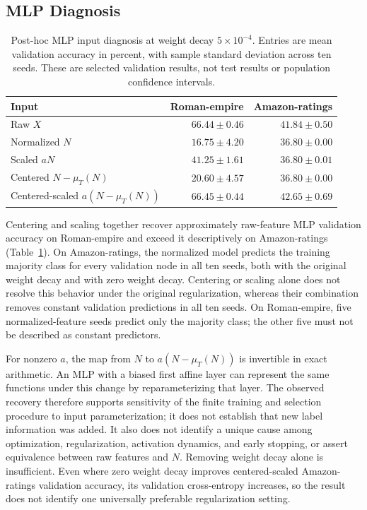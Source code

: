 \subsection{MLP Diagnosis}

\begin{table}[ht]
\centering
\caption{Post-hoc MLP input diagnosis at weight decay $5\times10^{-4}$. Entries are mean validation accuracy in percent, with sample standard deviation across ten seeds. These are selected validation results, not test results or population confidence intervals.}
\label{tab:mlp_parameterization}
\small
\begin{tabular}{@{}lrr@{}}
\toprule
Input & Roman-empire & Amazon-ratings \\
\midrule
Raw $X$ & $66.44\pm0.46$ & $41.84\pm0.50$ \\
Normalized $N$ & $16.75\pm4.20$ & $36.80\pm0.00$ \\
Scaled $aN$ & $41.25\pm1.61$ & $36.80\pm0.01$ \\
Centered $N-\mu_T(N)$ & $20.60\pm4.57$ & $36.80\pm0.00$ \\
Centered-scaled $a(N-\mu_T(N))$ & $66.45\pm0.44$ & $42.65\pm0.69$ \\
\bottomrule
\end{tabular}
\end{table}

Centering and scaling together recover approximately raw-feature MLP validation accuracy on Roman-empire and exceed it descriptively on Amazon-ratings (Table~\ref{tab:mlp_parameterization}). On Amazon-ratings, the normalized model predicts the training majority class for every validation node in all ten seeds, both with the original weight decay and with zero weight decay. Centering or scaling alone does not resolve this behavior under the original regularization, whereas their combination removes constant validation predictions in all ten seeds. On Roman-empire, five normalized-feature seeds predict only the majority class; the other five must not be described as constant predictors.

For nonzero $a$, the map from $N$ to $a(N-\mu_T(N))$ is invertible in exact arithmetic. An MLP with a biased first affine layer can represent the same functions under this change by reparameterizing that layer. The observed recovery therefore supports sensitivity of the finite training and selection procedure to input parameterization; it does not establish that new label information was added. It also does not identify a unique cause among optimization, regularization, activation dynamics, and early stopping, or assert equivalence between raw features and $N$. Removing weight decay alone is insufficient. Even where zero weight decay improves centered-scaled Amazon-ratings validation accuracy, its validation cross-entropy increases, so the result does not identify one universally preferable regularization setting.

